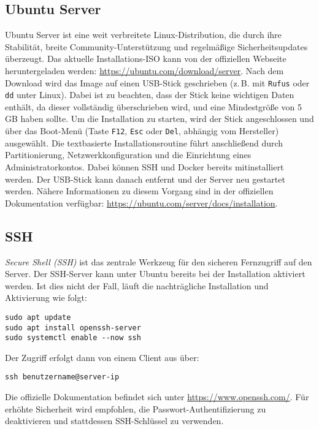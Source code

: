 \documentclass[12pt,a4paper]{report}
\begin{document}
  \subsection{Ubuntu Server}  
  Ubuntu Server ist eine weit verbreitete Linux-Distribution, die durch ihre Stabilität, breite Community-Unterstützung und regelmäßige Sicherheitsupdates überzeugt.  
  Das aktuelle Installations-ISO kann von der offiziellen Webseite heruntergeladen werden: \url{https://ubuntu.com/download/server}.  
  Nach dem Download wird das Image auf einen USB-Stick geschrieben (z.\,B. mit \texttt{Rufus} oder \texttt{dd} unter Linux).  
  Dabei ist zu beachten, dass der Stick keine wichtigen Daten enthält, da dieser vollständig überschrieben wird, und eine Mindestgröße von 5\,GB haben sollte.    
  Um die Installation zu starten, wird der Stick angeschlossen und über das Boot-Menü (Taste \texttt{F12}, \texttt{Esc} oder \texttt{Del}, abhängig vom Hersteller) ausgewählt.  
  Die textbasierte Installationsroutine führt anschließend durch Partitionierung, Netzwerkkonfiguration und die Einrichtung eines Administratorkontos. 
  Dabei können SSH und Docker bereits mitinstalliert werden. Der USB-Stick kann danach entfernt und der Server neu gestartet werden.
  Nähere Informationen zu diesem Vorgang sind in der offiziellen Dokumentation verfügbar: \url{https://ubuntu.com/server/docs/installation}.

  \subsection{SSH}  
  \emph{Secure Shell (SSH)} ist das zentrale Werkzeug für den sicheren Fernzugriff auf den Server.  
  Der SSH-Server kann unter Ubuntu bereits bei der Installation aktiviert werden. 
  Ist dies nicht der Fall, läuft die nachträgliche Installation und Aktivierung wie folgt:  

  \begin{verbatim}
sudo apt update
sudo apt install openssh-server
sudo systemctl enable --now ssh
  \end{verbatim}  

  Der Zugriff erfolgt dann von einem Client aus über:  

  \begin{verbatim}
ssh benutzername@server-ip
  \end{verbatim}  

  Die offizielle Dokumentation befindet sich unter \url{https://www.openssh.com/}.  
  Für erhöhte Sicherheit wird empfohlen, die Passwort-Authentifizierung zu deaktivieren und stattdessen SSH-Schlüssel zu verwenden.  
\end{document}
